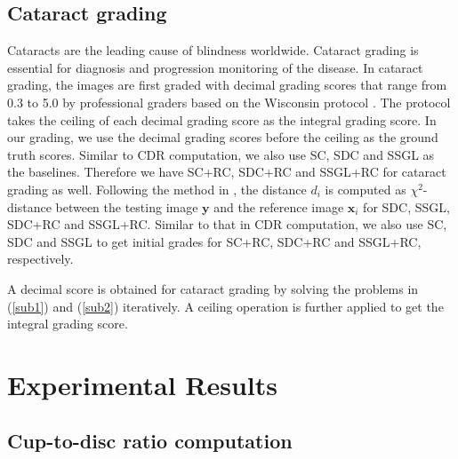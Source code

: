 \documentclass[journal]{IEEEtran}
\begin{document}
\subsection{Cataract grading}
 Cataracts are the leading cause of   blindness worldwide. Cataract grading  is essential for diagnosis and progression monitoring of the disease. In cataract grading, the images are first graded with decimal grading scores that
 range from 0.3  to 5.0 by professional graders based on
 the Wisconsin protocol \cite{Klein1990}.   The protocol takes the ceiling of each decimal grading score as the integral grading score.
 In our grading, we use the decimal grading scores before the ceiling as the ground truth scores.
 Similar to CDR computation, we also use SC, SDC and SSGL as the baselines.
 Therefore we have SC+RC, SDC+RC and SSGL+RC for cataract grading as well.
 Following the method in \cite{Xu13}, the distance $d_i$ is computed as $ \chi^2$-distance between the testing image $\textbf{y}$ and the reference image $\textbf{x}_i$ for SDC, SSGL, SDC+RC and SSGL+RC.
  Similar to that in CDR computation, we also use SC, SDC and SSGL to get initial grades for SC+RC, SDC+RC and SSGL+RC, respectively.

A decimal score is obtained for cataract grading by solving the problems in (\ref{sub1}) and (\ref{sub2}) iteratively. A ceiling operation is further applied to get the integral grading score.


\section{Experimental
Results} \label{Exp}
\subsection{Cup-to-disc ratio computation}
\end{document}
